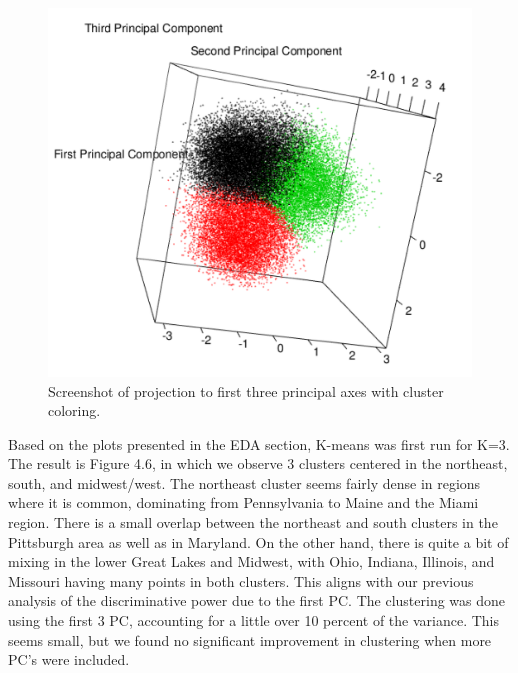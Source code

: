 \documentclass[english]{article}\usepackage{graphicx, color}
\numberwithin{equation}{section}
\numberwithin{figure}{section}
\begin{document}
\begin{figure}
\begin{center}
\includegraphics[scale = .3]{PCA3DScatter.png}
\caption{Screenshot of projection to first three principal axes with cluster coloring.}
\end{center}
\end{figure}

Based on the plots presented in the EDA section, K-means was first run for K=3. The result is Figure 4.6, in which we observe 3 clusters centered in the northeast, south, and midwest/west. The northeast cluster seems fairly dense in regions where it is common, dominating from Pennsylvania to Maine and the Miami region. There is a small overlap between the northeast and south clusters in the Pittsburgh area as well as in Maryland. On the other hand, there is quite a bit of mixing in the lower Great Lakes and Midwest, with Ohio, Indiana, Illinois, and Missouri having many points in both clusters. This aligns with our previous analysis of the discriminative power due to the first PC. The clustering was done using the first 3 PC, accounting for a little over 10 percent of the variance. This seems small, but we found no significant improvement in clustering when more PC's were included.
\end{document}
